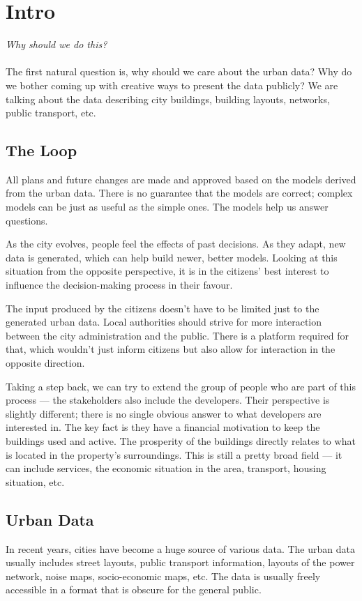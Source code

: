 \section{Intro}
\textit{Why should we do this?}

\paragraph{}The first natural question is, why should we care about the urban data? Why do we bother coming up with creative ways to present the data publicly? We are talking about the data describing city buildings, building layouts, networks, public transport, etc. 

\subsection{The Loop}

All plans and future changes are made and approved based on the models derived from the urban data. There is no guarantee that the models are correct; complex models can be just as useful as the simple ones. The models help us answer questions.

As the city evolves, people feel the effects of past decisions. As they adapt, new data is generated, which can help build newer, better models. Looking at this situation from the opposite perspective, it is in the citizens' best interest to influence the decision-making process in their favour. 

The input produced by the citizens doesn't have to be limited just to the generated urban data. Local authorities should strive for more interaction between the city administration and the public. There is a platform required for that, which wouldn't just inform citizens but also allow for interaction in the opposite direction. 

Taking a step back, we can try to extend the group of people who are part of this process --- the stakeholders also include the developers. Their perspective is slightly different; there is no single obvious answer to what developers are interested in. The key fact is they have a financial motivation to keep the buildings used and active. The prosperity of the buildings directly relates to what is located in the property's surroundings. This is still a pretty broad field --- it can include services, the economic situation in the area, transport, housing situation, etc. 

\subsection{Urban Data}
In recent years, cities have become a huge source of various data. The urban data usually includes street layouts, public transport information, layouts of the power network, noise maps, socio-economic maps, etc. The data is usually freely accessible in a format that is obscure for the general public. 

